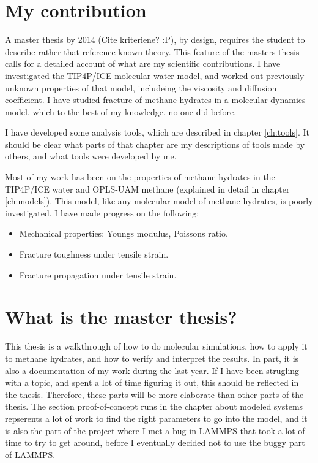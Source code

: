 \section{My contribution}
A master thesis by 2014 (Cite kriteriene? :P), by design, requires the student to describe rather that reference known theory. This feature of the masters thesis calls for a detailed account of what are my scientific contributions. I have investigated the TIP4P/ICE molecular water model, and worked out previously unknown properties of that model, includeing the viscosity and diffusion coefficient. I have studied fracture of methane hydrates in a molecular dynamics model, which to the best of my knowledge, no one did before. 

I have developed some analysis tools, which are described in chapter \ref{ch:tools}. It should be clear what parts of that chapter are my descriptions of tools made by others, and what tools were developed by me.

Most of my work has been on the properties of methane hydrates in the TIP4P/ICE water and OPLS-UAM methane (explained in detail in chapter \ref{ch:models}). This model, like any molecular model of methane hydrates, is poorly investigated. I have made progress on the following:

\begin{itemize}
\item Mechanical properties: Youngs modulus, Poissons ratio.
\item Fracture toughness under tensile strain.
\item Fracture propagation under tensile strain.
\end{itemize}


\section{What is the master thesis?}
This thesis is a walkthrough of how to do molecular simulations, how to apply it to methane hydrates, and how to verify and interpret the results. In part, it is also a documentation of my work during the last year. If I have been strugling with a topic, and spent a lot of time figuring it out, this should be reflected in the thesis. Therefore, these parts will be more elaborate than other parts of the thesis. The section proof-of-concept runs in the chapter about modeled systems repserents a lot of work to find the right parameters to go into the model, and it is also the part of the project where I met a bug in LAMMPS that took a lot of time to try to get around, before I eventually decided not to use the buggy part of LAMMPS.


